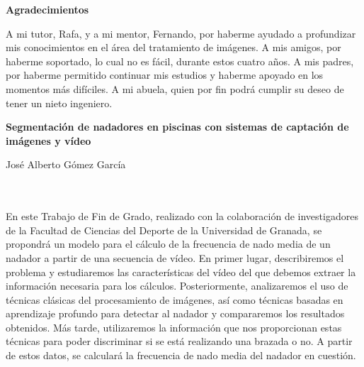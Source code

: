\cleardoublepage
\thispagestyle{empty}

\begin{center}
{\large\bfseries Agradecimientos}\\
\end{center}

A mi tutor, Rafa, y a mi mentor, Fernando, por haberme ayudado a profundizar mis conocimientos en el área del tratamiento de imágenes. A mis amigos, por haberme soportado, lo cual no es fácil, durante estos cuatro años. A mis padres, por haberme permitido continuar mis estudios y haberme apoyado en los momentos más difíciles. A mi abuela, quien por fin podrá cumplir su deseo de tener un nieto ingeniero.

\clearpage
\thispagestyle{empty}

\begin{center}
{\large\bfseries Segmentación de nadadores en piscinas con sistemas de captación de imágenes y vídeo}\\
\end{center}


\begin{center}
José Alberto Gómez García\\
\end{center}

\\

\vspace{0.7cm}
\\

En este Trabajo de Fin de Grado, realizado con la colaboración de investigadores de la Facultad de Ciencias del Deporte de la Universidad de Granada, se propondrá un modelo para el cálculo de la frecuencia de nado media de un nadador a partir de una secuencia de vídeo. En primer lugar, describiremos el problema y estudiaremos las características del vídeo del que debemos extraer la información necesaria para los cálculos. Posteriormente, analizaremos el uso de técnicas clásicas del procesamiento de imágenes, así como técnicas basadas en aprendizaje profundo para detectar al nadador y compararemos los resultados obtenidos. Más tarde, utilizaremos la información que nos proporcionan estas técnicas para poder discriminar si se está realizando una brazada o no. A partir de estos datos, se calculará la frecuencia de nado media del nadador en cuestión.

